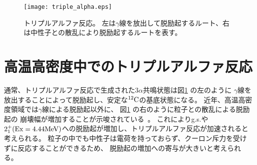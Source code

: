 \documentclass[../master]{subfiles}
\begin{document}
\begin{figure}
  \centering
  \texttt{[image: triple\_alpha.eps]}
  \caption[トリプルアルファ反応。]{トリプルアルファ反応。
    左は$\gamma$線を放出して脱励起するルート、右は中性子との散乱により脱励起するルートを表す。}
  \label{fig::triple_alpha}
\end{figure}

\section{高温高密度中でのトリプルアルファ反応}
\label{seq::triplealphareaction}
通常、トリプルアルファ反応で生成された$3\alpha$共鳴状態は図\ref{fig::triple_alpha} の左のように
$\gamma$線を放出することによって脱励起し、安定な${}^{12}{\rm C}$の基底状態になる。
近年、高温高密度領域では$\gamma$線による脱励起以外に、
図\ref{fig::triple_alpha} の右のように粒子との散乱による脱励起の
崩壊幅が増加することが示唆されている~\cite{hotdensemedium}。
これによりg.s.や$2_{1}^{+} ({\rm Ex} = 4.44 {\rm MeV}) $への脱励起が増加し、トリプルアルファ反応が加速されると考えられる。
粒子の中でも中性子は電荷を持っておらず、クーロン斥力を受けずに反応することができるため、
脱励起の増加への寄与が大きいと考えられる。


\end{document}
